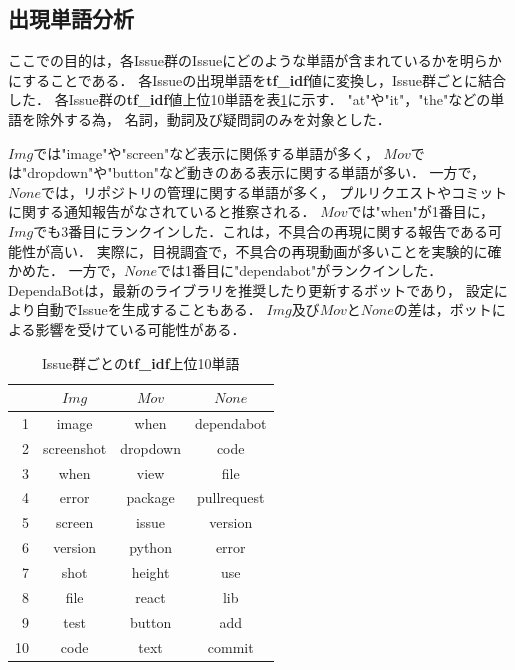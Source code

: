 \subsection{出現単語分析}
ここでの目的は，各Issue群のIssueにどのような単語が含まれているかを明らかにすることである．
各Issueの出現単語を\textbf{tf\_idf}値に変換し，Issue群ごとに結合した．
各Issue群の\textbf{tf\_idf}値上位10単語を表\ref{tf-idf_result}に示す．
"at"や"it"，"the"などの単語を除外する為，
名詞，動詞及び疑問詞のみを対象とした．

$Img$では"image"や"screen"など表示に関係する単語が多く，
$Mov$では"dropdown"や"button"など動きのある表示に関する単語が多い．
一方で，$None$では，リポジトリの管理に関する単語が多く，
プルリクエストやコミットに関する通知報告がなされていると推察される．
$Mov$では"when"が1番目に，$Img$でも3番目にランクインした．これは，不具合の再現に関する報告である可能性が高い．
実際に，目視調査で，不具合の再現動画が多いことを実験的に確かめた．
一方で，$None$では1番目に"dependabot"がランクインした．DependaBotは，最新のライブラリを推奨したり更新するボットであり，
設定により自動でIssueを生成することもある．
$Img$及び$Mov$と$None$の差は，ボットによる影響を受けている可能性がある．

\begin{table}[t]
  \begin{center}
  \caption{Issue群ごとの\textbf{tf\_idf}上位10単語}
  \begin{tabular}{r | c c c }
     & $Img$ & $Mov$ & $None$\\
    \hline \hline
    1 & image & when & dependabot\\
    2 & screenshot & dropdown & code\\
    3 & when & view & file\\
    4 & error & package & pullrequest\\
    5 & screen & issue & version\\
    6 & version & python & error\\
    7 & shot & height & use\\
    8 & file & react & lib\\
    9 & test & button & add\\
    10& code & text & commit\\
  \end{tabular}\\
  \label{tf-idf_result}
  \end{center}
\end{table}
